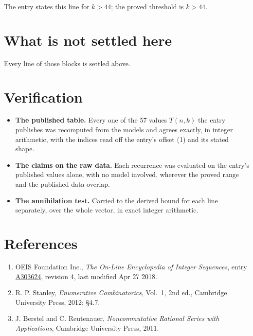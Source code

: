 \documentclass[11pt]{article}
\theoremstyle{definition}
\begin{document}
The entry states this line for $k > 44$; the proved threshold is $k > 44$.

\section{What is not settled here}

Every line of those blocks is settled above.

\section{Verification}

\begin{itemize}

\item {\bfseries The published table.} Every one of the 57 values $T(n,k)$ the entry publishes was recomputed from the models and agrees exactly, in integer arithmetic, with the indices read off the entry's offset (1) and its stated shape.

\item {\bfseries The claims on the raw data.} Each recurrence was evaluated on the entry's published values alone, with no model involved, wherever the proved range and the published data overlap.

\item {\bfseries The annihilation test.} Carried to the derived bound for each line separately, over the whole vector, in exact integer arithmetic.

\end{itemize}

\section{References}

\begin{enumerate}

\item OEIS Foundation Inc., \emph{The On-Line Encyclopedia of Integer Sequences}, entry \href{https://oeis.org/A303624}{A303624}, revision 4, last modified Apr 27 2018.

\item R. P. Stanley, \emph{Enumerative Combinatorics}, Vol.~1, 2nd ed., Cambridge University Press, 2012; \S4.7.

\item J. Berstel and C. Reutenauer, \emph{Noncommutative Rational Series with Applications}, Cambridge University Press, 2011.

\end{enumerate}
\end{document}
